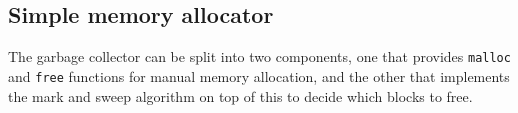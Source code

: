 %
%


\subsection{Simple memory allocator}
The garbage collector can be split into two components, one that provides \verb|malloc| and \verb|free| functions for manual memory allocation, and the other that implements the mark and sweep algorithm on top of this to decide which blocks to free. 

